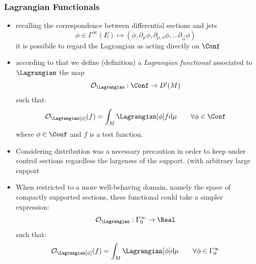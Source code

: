 \documentclass[a4paper,11pt]{scrartcl}
\begin{document}
	\subsubsection*{Lagrangian Functionals}
	\begin{itemize}
		\item recalling the correspondence between differential sections and jets
		$$ \phi \in \Gamma^\infty (E) \mapsto (\phi, \partial_\mu \phi, \partial_{\mu, \nu} \phi , \ldots \partial_{\vec{\alpha}}\phi) $$
		it is possibile to regard the Lagrangian as acting directly on $\Conf$
		\item according to that we define (definition) a \emph{Lagrangian functional} associated to $\Lagrangian$ the map
		$$ \mathcal{O}_\Lagrangian : \Conf \rightarrow D'(M)  $$
		such that:
		$$ \mathcal{O}_\Lagrangian [\phi] (f) = \int_M \Lagrangian [\phi] f \textrm{d}\mu \qquad \forall \phi \in \Conf $$
		where $\phi\in \Conf$ and $f$ is a test function.
		\item Considering distribution was a necessary precaution in order to keep under control sections regardless the largeness of the support. (with arbitrary large support
		\item When restricted to a more well-behaving domain, namely the space of compactly supported sections, these functional could take a simpler expression:
		$$ \mathcal{O}_\Lagrangian : \Gamma_0^\infty \rightarrow \Real  $$
		such that:
		$$ \mathcal{O}_\Lagrangian [\phi] (f) = \int_M \Lagrangian [\phi] \textrm{d}\mu  \qquad \forall \phi \in  \Gamma_0^\infty  $$
	\end{itemize}
\end{document}
